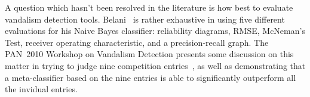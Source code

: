 A question which hasn't been resolved in the literature is how best to
evaluate vandalism detection tools.
Belani~\cite{Belani2010} is rather exhaustive in using five different
evaluations for his Naive Bayes classifier: reliability diagrams,
RMSE, McNeman's Test, receiver operating characteristic,
and a precision-recall graph.
The PAN~2010 Workshop on Vandalism Detection presents some discussion
on this matter in trying to judge nine competition
entries~\cite{Potthast2010b}, as well as demonstrating that a
meta-classifier based on the nine entries is able to significantly
outperform all the invidual entries.


